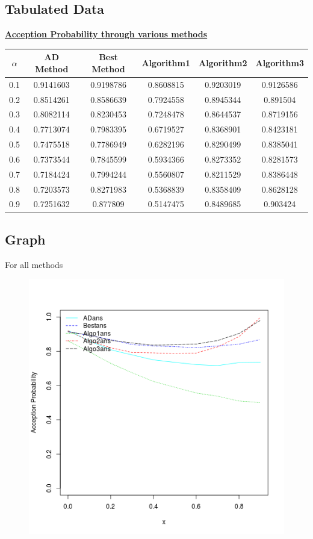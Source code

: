 \documentclass[11pt]{article}
\begin{document}
\subsection{Tabulated Data}
\begin{center}\textbf{\underline{Acception Probability through various methods}} \end{center}
\begin{tabular}{|c|c|c|c|c|c|}
\hline
$\alpha$ & AD Method & Best Method & Algorithm1 & Algorithm2 & Algorithm3\\\hline 
0.1  & 0.9141603 & 0.9198786 & 0.8608815 & 0.9203019 & 0.9126586 \\ \hline
0.2  & 0.8514261 & 0.8586639 & 0.7924558 & 0.8945344 & 0.891504 \\ \hline
0.3  & 0.8082114 & 0.8230453 & 0.7248478 & 0.8644537 & 0.8719156 \\ \hline
0.4  & 0.7713074 & 0.7983395 & 0.6719527 & 0.8368901 & 0.8423181 \\ \hline
0.5  & 0.7475518 & 0.7786949 & 0.6282196 & 0.8290499 & 0.8385041 \\ \hline
0.6  & 0.7373544 & 0.7845599 & 0.5934366 & 0.8273352 & 0.8281573 \\ \hline
0.7  & 0.7184424 & 0.7994244 & 0.5560807 & 0.8211529 & 0.8386448 \\ \hline
0.8  & 0.7203573 & 0.8271983 & 0.5368839 & 0.8358409 & 0.8628128 \\ \hline
0.9  & 0.7251632 & 0.877809 & 0.5147475 & 0.8489685 & 0.903424 \\ \hline
\end{tabular}
\subsection{Graph}
For all methods
\begin{figure}[H]
\centering
\includegraphics[scale=1]{Main}
\end{figure}
\end{document}
